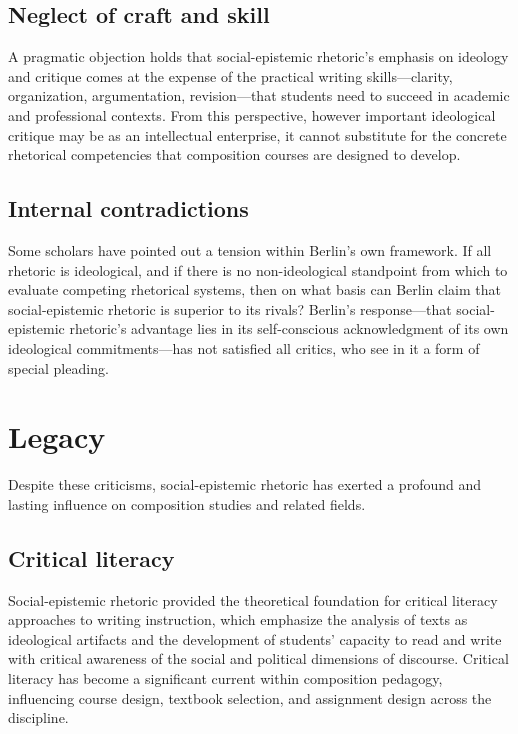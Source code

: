 \documentclass[12pt]{article}
\begin{document}
\subsection*{Neglect of craft and skill}

A pragmatic objection holds that social-epistemic rhetoric's emphasis on ideology and critique comes at the expense of the practical writing skills---clarity, organization, argumentation, revision---that students need to succeed in academic and professional contexts. From this perspective, however important ideological critique may be as an intellectual enterprise, it cannot substitute for the concrete rhetorical competencies that composition courses are designed to develop.

\subsection*{Internal contradictions}

Some scholars have pointed out a tension within Berlin's own framework. If all rhetoric is ideological, and if there is no non-ideological standpoint from which to evaluate competing rhetorical systems, then on what basis can Berlin claim that social-epistemic rhetoric is superior to its rivals? Berlin's response---that social-epistemic rhetoric's advantage lies in its self-conscious acknowledgment of its own ideological commitments---has not satisfied all critics, who see in it a form of special pleading.

\section{Legacy}

Despite these criticisms, social-epistemic rhetoric has exerted a profound and lasting influence on composition studies and related fields.

\subsection*{Critical literacy}

Social-epistemic rhetoric provided the theoretical foundation for critical literacy approaches to writing instruction, which emphasize the analysis of texts as ideological artifacts and the development of students' capacity to read and write with critical awareness of the social and political dimensions of discourse. Critical literacy has become a significant current within composition pedagogy, influencing course design, textbook selection, and assignment design across the discipline.
\end{document}
